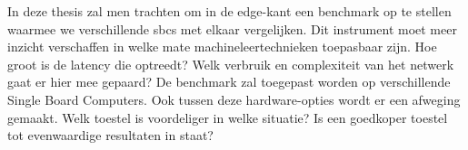 In deze thesis zal men trachten om in de edge-kant een benchmark op te stellen waarmee we verschillende \gls{sbc}s met elkaar vergelijken. Dit instrument moet meer inzicht verschaffen in welke mate machineleertechnieken toepasbaar zijn. Hoe groot is de latency die optreedt? Welk verbruik en complexiteit van het netwerk gaat er hier mee gepaard? De benchmark zal toegepast worden op verschillende Single Board Computers. Ook tussen deze hardware-opties wordt er een afweging gemaakt. Welk toestel is voordeliger in welke situatie? Is een goedkoper toestel tot evenwaardige resultaten in staat?

